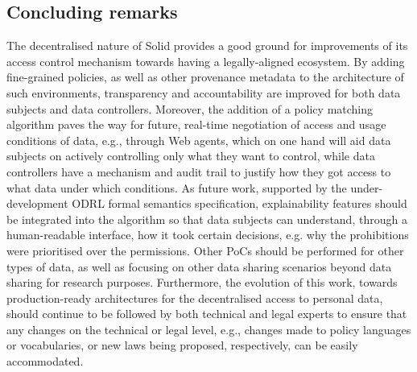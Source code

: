 \subsection{Concluding remarks}
\label{sec:conclusions_poc}

The decentralised nature of Solid provides a good ground for improvements of its access control mechanism towards having a legally-aligned ecosystem.
By adding fine-grained policies, as well as other provenance metadata to the architecture of such environments, transparency and accountability are improved for both data subjects and data controllers.
Moreover, the addition of a policy matching algorithm paves the way for future, real-time negotiation of access and usage conditions of data, e.g., through Web agents, which on one hand will aid data subjects on actively controlling only what they want to control, while data controllers have a mechanism and audit trail to justify how they got access to what data under which conditions.
As future work, supported by the under-development ODRL formal semantics specification, explainability features should be integrated into the algorithm so that data subjects can understand, through a human-readable interface, how it took certain decisions, e.g. why the prohibitions were prioritised over the permissions.
Other PoCs should be performed for other types of data, as well as focusing on other data sharing scenarios beyond data sharing for research purposes.
Furthermore, the evolution of this work, towards production-ready architectures for the decentralised access to personal data, should continue to be followed by both technical and legal experts to ensure that any changes on the technical or legal level, e.g., changes made to policy languages or vocabularies, or new laws being proposed, respectively, can be easily accommodated.